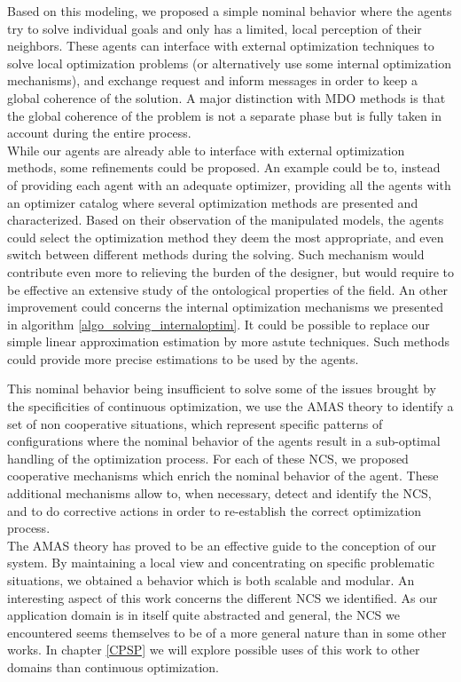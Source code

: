 Based on this modeling, we proposed a simple nominal behavior where the agents try to solve individual goals and only has a limited, local perception of their neighbors. These agents can interface with external optimization techniques to solve local optimization problems (or alternatively use some internal optimization mechanisms), and exchange request and inform messages in order to keep a global coherence of the solution. A major distinction with MDO methods is that the global coherence of the problem is not a separate phase but is fully taken in account during the entire process.
\\
While our agents are already able to interface with external optimization methods, some refinements could be proposed. An example could be to, instead of providing each agent with an adequate optimizer, providing all the agents with an optimizer catalog where several optimization methods are presented and characterized. Based on their observation of the manipulated models, the agents could select the optimization method they deem the most appropriate, and even switch between different methods during the solving. Such mechanism would contribute even more to relieving the burden of the designer, but would require to be effective an extensive study of the ontological properties of the field. An other improvement could concerns the internal optimization mechanisms we presented in algorithm \ref{algo_solving_internaloptim}. It could be possible to replace our simple linear approximation estimation by more astute techniques. Such methods could provide more precise estimations to be used by the agents.

This nominal behavior being insufficient to solve some of the issues brought by the specificities of continuous optimization, we use the AMAS theory to identify a set of non cooperative situations, which represent specific patterns of configurations where the nominal behavior of the agents result in a sub-optimal handling of the optimization process. For each of these NCS, we proposed cooperative mechanisms which enrich the nominal behavior of the agent. These additional mechanisms allow to, when necessary, detect and identify the NCS, and to do corrective actions in order to re-establish the correct optimization process.
\\
The AMAS theory has proved to be an effective guide to the conception of our system. By maintaining a local view and concentrating on specific problematic situations, we obtained a behavior which is both scalable and modular. An interesting aspect of this work concerns the different NCS we identified. As our application domain is in itself quite abstracted and general, the NCS we encountered seems themselves to be of a more general nature than in some other works. In chapter \ref{CPSP} we will explore possible uses of this work to other domains than continuous optimization.

